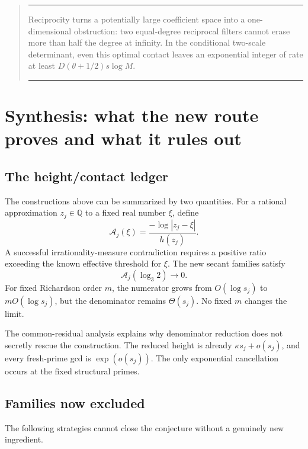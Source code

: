 \documentclass[11pt,oneside]{article}
\theoremstyle{definition}
\theoremstyle{remark}
\newcommand{\Q}{\mathbb Q}
\newenvironment{resultbox}
 {\begin{quote}\hrule\smallskip\noindent}
 {\par\smallskip\hrule\end{quote}}
\begin{document}
\begin{resultbox}
Reciprocity turns a potentially large coefficient space into a one-dimensional obstruction:
two equal-degree reciprocal filters cannot erase more than half the degree at infinity.  In
the conditional two-scale determinant, even this optimal contact leaves an exponential
integer of rate at least $D(\theta+1/2)s\log M$.
\end{resultbox}

\section{Synthesis: what the new route proves and what it rules out}
\label{sec:synthesis}

\subsection{The height/contact ledger}

The constructions above can be summarized by two quantities.  For a rational approximation
$z_j\in\Q$ to a fixed real number $\xi$, define
\begin{equation}
 \mathcal A_j(\xi)=
 \frac{-\log|z_j-\xi|}{h(z_j)}.
 \label{eq:amplification-ratio}
\end{equation}
A successful irrationality-measure contradiction requires a positive ratio exceeding the
known effective threshold for $\xi$.  The new secant families satisfy
\[
 \mathcal A_j\!\left(\log_3 2\right)\longrightarrow0.
\]
For fixed Richardson order $m$, the numerator grows from $O(\log s_j)$ to
$mO(\log s_j)$, but the denominator remains $\Theta(s_j)$.  No fixed $m$ changes the limit.

The common-residual analysis explains why denominator reduction does not secretly rescue the
construction.  The reduced height is already $\kappa s_j+o(s_j)$, and every fresh-prime gcd
is $\exp(o(s_j))$.  The only exponential cancellation occurs at the fixed structural primes.

\subsection{Families now excluded}

The following strategies cannot close the conjecture without a genuinely new ingredient.
\end{document}
